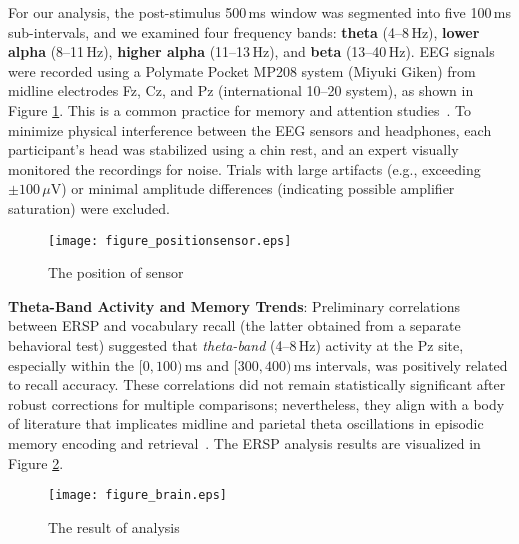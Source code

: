 \documentclass{ehissymp}
\begin{document}
For our analysis, the post-stimulus 500\,ms window was segmented into five 100\,ms sub-intervals, and we examined four frequency bands: \textbf{theta} (4--8\,Hz), \textbf{lower alpha} (8--11\,Hz), \textbf{higher alpha} (11--13\,Hz), and \textbf{beta} (13--40\,Hz).
EEG signals were recorded using a Polymate Pocket MP208 system (Miyuki Giken) from midline electrodes Fz, Cz, and Pz (international 10--20 system), as shown in Figure \ref{fig:sensor_pos}. This is a common practice for memory and attention studies~\cite{Klimesch1999,Hsieh2014}.
To minimize physical interference between the EEG sensors and headphones, each participant's head was stabilized using a chin rest, and an expert visually monitored the recordings for noise.
Trials with large artifacts (e.g., exceeding $\pm100\,\mu\mathrm{V}$) or minimal amplitude differences (indicating possible amplifier saturation) were excluded.

\begin{figure}[H]
\centering
\texttt{[image: figure\_positionsensor.eps]}
\caption{The position of sensor}
\label{fig:sensor_pos} %
\end{figure}



\textbf{Theta-Band Activity and Memory Trends}:
Preliminary correlations between ERSP and vocabulary recall (the latter obtained from a separate behavioral test) suggested that \emph{theta-band} (4--8\,Hz) activity at the Pz site, especially within the \([0,100)\,\mathrm{ms}\) and \([300,400)\,\mathrm{ms}\) intervals, was positively related to recall accuracy. These correlations did not remain statistically significant after robust corrections for multiple comparisons; nevertheless, they align with a body of literature that implicates midline and parietal theta oscillations in episodic memory encoding and retrieval~\cite{Klimesch1999,Kahana2006,Hsieh2014}. The ERSP analysis results are visualized in Figure \ref{fig:brain_analysis}.
\begin{figure}[H]
 \centering
 \texttt{[image: figure\_brain.eps]}
 \caption{The result of analysis}
 \label{fig:brain_analysis} %
\end{figure}
\end{document}
